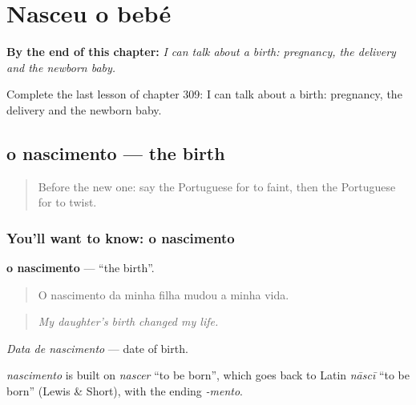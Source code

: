 
\chapter{Nasceu o bebé}
\label{ch:pt-nasceu-o-bebe}

\begin{chapteropening}
\textbf{By the end of this chapter:} \emph{I can talk about a birth: pregnancy, the delivery and the newborn baby.}

Complete the last lesson of chapter 309: I can talk about a birth: pregnancy, the delivery and the newborn baby.
\end{chapteropening}

\section[o nascimento]{o nascimento — the birth}

\label{lesson:PT-C309-nascimento}



\begin{quote}
Before the new one: say the Portuguese for to faint, then the Portuguese for to twist.
\end{quote}

\subsection*{You'll want to know: o nascimento}
\textbf{o nascimento} — \textquotedblleft{}the birth\textquotedblright{}.

\begin{quote}
O nascimento da minha filha mudou a minha vida.
\end{quote}

\begin{quote}
\emph{My daughter’s birth changed my life.}
\end{quote}

\emph{Data de nascimento} — date of birth.

\begin{cousinweb}
\emph{nascimento} is built on \emph{nascer} \textquotedblleft{}to be born\textquotedblright{}, which goes back to Latin \emph{nāscī} \textquotedblleft{}to be born\textquotedblright{} (Lewis \& Short), with the ending \emph{-mento}.
\end{cousinweb}

